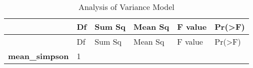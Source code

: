 \documentclass[]{article}
\begin{document}
\begin{longtable}[c]{@{}llllll@{}}
\caption{Analysis of Variance Model}\tabularnewline
\toprule
\begin{minipage}[b]{0.36\columnwidth}\raggedright\strut
~
\strut\end{minipage} &
\begin{minipage}[b]{0.05\columnwidth}\raggedright\strut
Df
\strut\end{minipage} &
\begin{minipage}[b]{0.10\columnwidth}\raggedright\strut
Sum Sq
\strut\end{minipage} &
\begin{minipage}[b]{0.11\columnwidth}\raggedright\strut
Mean Sq
\strut\end{minipage} &
\begin{minipage}[b]{0.11\columnwidth}\raggedright\strut
F value
\strut\end{minipage} &
\begin{minipage}[b]{0.11\columnwidth}\raggedright\strut
Pr(\textgreater{}F)
\strut\end{minipage}\tabularnewline
\midrule
\endfirsthead
\toprule
\begin{minipage}[b]{0.36\columnwidth}\raggedright\strut
~
\strut\end{minipage} &
\begin{minipage}[b]{0.05\columnwidth}\raggedright\strut
Df
\strut\end{minipage} &
\begin{minipage}[b]{0.10\columnwidth}\raggedright\strut
Sum Sq
\strut\end{minipage} &
\begin{minipage}[b]{0.11\columnwidth}\raggedright\strut
Mean Sq
\strut\end{minipage} &
\begin{minipage}[b]{0.11\columnwidth}\raggedright\strut
F value
\strut\end{minipage} &
\begin{minipage}[b]{0.11\columnwidth}\raggedright\strut
Pr(\textgreater{}F)
\strut\end{minipage}\tabularnewline
\midrule
\endhead
\begin{minipage}[t]{0.36\columnwidth}\raggedright\strut
\textbf{mean\_simpson}
\strut\end{minipage} &
\begin{minipage}[t]{0.05\columnwidth}\raggedright\strut
1
\strut\end{minipage} &
\begin{minipage}[t]{0.10\columnwidth}\raggedright\strut

\end{minipage}
\end{longtable}
\end{document}
